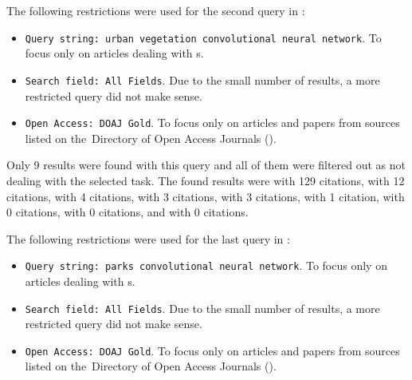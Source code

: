
The following restrictions were used for the second query in :

\begin{itemize}
	\item \verb|Query string: urban vegetation convolutional neural network|. To focus only on articles dealing with s.
	\item \verb|Search field: All Fields|. Due to the small number of results, a more restricted query did not make sense.
	\item \verb|Open Access: DOAJ Gold|. To focus only on articles and papers from sources listed on the~Di\-rectory of Open Access Journals ().
\end{itemize}

Only 9 results were found with this query and all of them were filtered out as not dealing with the selected task. The found results were \cite{cnn-satellite-orthoimagery} with 129 citations, \cite{urban-green-trees-worldview} with 12 citations, \cite{cnn-urban-aerial} with 4 citations, \cite{gated-cnn-rs} with 3 citations, \cite{polarized-sar-cnn} with 3 citations, \cite{urban-green-quantification} with 1 citation, \cite{dl-vegetation} with 0 citations, \cite{urban-green-unsupervised-aerial} with 0 citations, and \cite{tibet-ice-ml} with 0 citations.

The following restrictions were used for the last query in :

\begin{itemize}
	\item \verb|Query string: parks convolutional neural network|. To focus only on articles dealing with s.
	\item \verb|Search field: All Fields|. Due to the small number of results, a more restricted query did not make sense.
	\item \verb|Open Access: DOAJ Gold|. To focus only on articles and papers from sources listed on the~Di\-rectory of Open Access Journals ().
\end{itemize}

